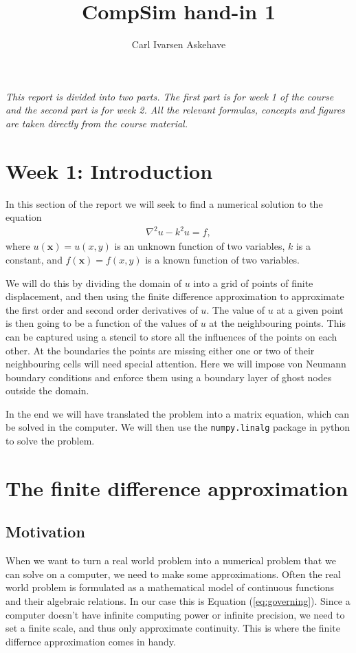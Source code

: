 \documentclass[acmtog]{acmart}
\begin{document}
\title{CompSim hand-in 1}
\author{Carl Ivarsen Askehave}

\maketitle
\fancyfoot{}
\thispagestyle{empty}

\textit{This report is divided into two parts. The first part is for week 1 of the course and the second part is for week 2. All the relevant formulas, concepts and figures are taken directly from the course material.
\noindent }

\section*{Week 1: Introduction}
In this section of the report we will seek to find a numerical solution to the equation
%
\begin{align}
  \nabla^2 u - k^2 u = f,
  \label{eq:governing}
\end{align}
%
where $u(\boldsymbol x) = u(x,y)$ is an unknown function of two variables, $k$
is a constant, and $f(\boldsymbol x) = f(x,y)$ is a known function of two
variables.

We will do this by dividing the domain of $u$ into a grid of points of finite
displacement, and then using the finite difference approximation to approximate
the first order and second order derivatives of $u$. The value of $u$ at a
given point is then going to be a function of the values of $u$ at the
neighbouring points. This can be captured using a stencil to store all the
influences of the points on each other. At the boundaries the points are
missing either one or two of their neighbouring cells will need special
attention. Here we will impose von Neumann boundary conditions and enforce them
using a boundary layer of ghost nodes outside the domain.

In the end we will have translated the problem into a matrix equation, which
can be solved in the computer. We will then use the \texttt{numpy.linalg}
package in python to solve the problem.

\section{The finite difference approximation}
\subsection{Motivation}
When we want to turn a real world problem into a numerical problem that we can
solve on a computer, we need to make some approximations. Often the real world
problem is formulated as a mathematical model of continuous functions and their
algebraic relations. In our case this is Equation (\ref{eq:governing}). Since a
computer doesn't have infinite computing power or infinite precision, we need
to set a finite scale, and thus only approximate continuity. This is where the
finite differnce approximation comes in handy.
\end{document}
